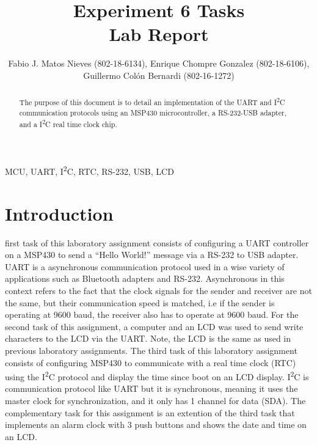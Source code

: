 \documentclass[journal]{IEEEtran}
\begin{document}
\title{Experiment 6 Tasks\\ Lab Report} \author{Fabio J. Matos
  Nieves (802-18-6134), Enrique Chompre Gonzalez (802-18-6106), \\Guillermo Colón Bernardi (802-16-1272)}
\maketitle
\begin{abstract}
  The purpose of this document is to detail an implementation of the UART and I\textsuperscript{2}C communication protocols using an MSP430 microcontroller, a RS-232-USB adapter, and a I\textsuperscript{2}C real time clock chip.
\end{abstract}
\begin{IEEEkeywords}
  MCU, UART, I\textsuperscript{2}C, RTC, RS-232, USB, LCD
\end{IEEEkeywords}
\IEEEpeerreviewmaketitle
\section{Introduction}
 first task of this laboratory assignment consists of configuring a UART controller on a MSP430 to send a ``Hello World!'' message via a RS-232 to USB adapter. UART is a asynchronous communication protocol used in a wise variety of applications such as Bluetooth adapters and RS-232. Asynchronous in this context refers to the fact that the clock signals for the sender and receiver are not the same, but their communication speed is matched, i.e if the sender is operating at 9600 baud, the receiver also has to operate at 9600 baud. For the second task of this assignment, a computer and an LCD was used to send write characters to the LCD via the UART. Note, the LCD is the same as used in previous laboratory assignments. The third task of this laboratory assignment consists of configuring MSP430 to communicate with a real time clock (RTC) using the I\textsuperscript{2}C protocol and display the time since boot on an LCD display. I\textsuperscript{2}C is communication protocol like UART but it is synchronous, meaning it uses the master clock for synchronization, and it only has 1 channel for data (SDA). The complementary task for this assignment is an extention of the third task that implements an alarm clock with 3 push buttons and shows the date and time on an LCD.
\end{document}
